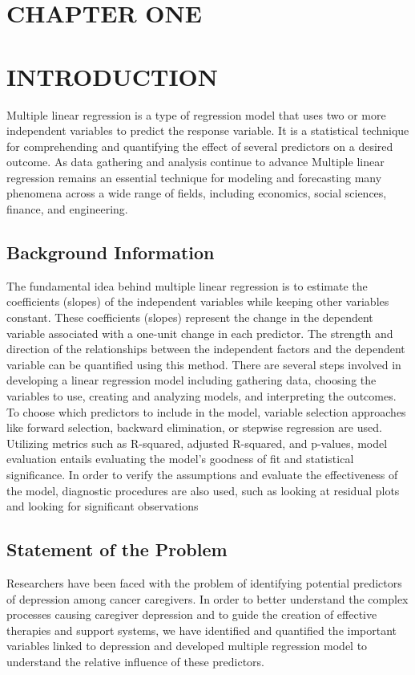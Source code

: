 \documentclass[12pt]{article}
\numberwithin{equation}{section}
\begin{document}

\section*{CHAPTER ONE}
\section*{INTRODUCTION}
\setcounter{section}{1}
\setcounter{subsection}{0}

Multiple linear regression is a type of regression model that uses two or more independent variables to predict the response variable. It is a statistical technique for comprehending and quantifying the effect of several predictors on a desired outcome. As data gathering and analysis continue to advance Multiple linear regression remains an essential technique for modeling and forecasting many phenomena across a wide range of fields, including economics, social sciences, finance, and engineering.

\subsection{Background Information}
The fundamental idea behind multiple linear regression is to estimate the coefficients (slopes) of the independent variables while keeping other variables constant. These coefficients (slopes) represent the change in the dependent variable associated with a one-unit change in each predictor. The strength and direction of the relationships between the independent factors and the dependent variable can be quantified using this method. There are several steps involved in developing a linear regression model including gathering data, choosing the variables to use, creating and analyzing models, and interpreting the outcomes. To choose which predictors to include in the model, variable selection approaches like forward selection, backward elimination, or stepwise regression are used. Utilizing metrics such as R-squared, adjusted R-squared, and p-values, model evaluation entails evaluating the model's goodness of fit and statistical significance. In order to verify the assumptions and evaluate the effectiveness of the model, diagnostic procedures are also used, such as looking at residual plots and looking for significant observations

\subsection{Statement of the Problem}
Researchers have been faced with the problem of identifying potential predictors of depression among cancer caregivers.  In order to better understand the complex processes causing caregiver depression and to guide the creation of effective therapies and support systems, we have identified and quantified the important variables linked to depression and developed multiple regression model to understand the relative influence of these predictors.
\end{document}

